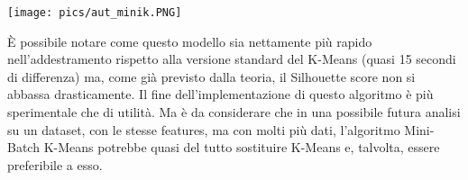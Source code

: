 \documentclass[12pt,oneside]{article}
\begin{document}
\begin{enumerate}
    \texttt{[image: pics/aut\_minik.PNG]}
    
    \begin{justify}
    È possibile notare come questo modello sia nettamente più rapido nell’addestramento rispetto alla versione standard del K-Means (quasi 15 secondi di differenza) ma, come già previsto dalla teoria, il Silhouette score non si abbassa drasticamente. Il fine dell’implementazione di questo algoritmo è più sperimentale che di utilità. Ma è da considerare che in una possibile futura analisi su un dataset, con le stesse features, ma con molti più dati, l’algoritmo Mini-Batch K-Means potrebbe quasi del tutto sostituire K-Means e, talvolta, essere preferibile a esso.
    \end{justify}
    \end{enumerate}
\end{document}
